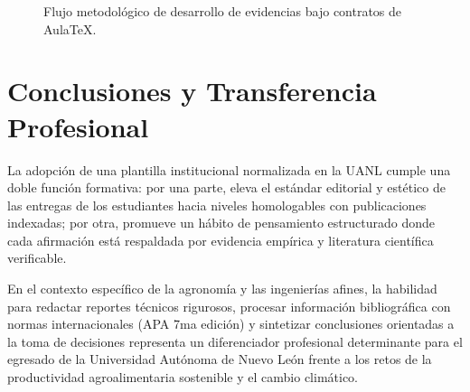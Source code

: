 \documentclass[
	spanish,
	letterpaper, oneside
]{article}
\begin{document}
\begin{figure}[htbp]
	\centering
	\caption{Flujo metodológico de desarrollo de evidencias bajo contratos de AulaTeX.}
	\label{fig:flujo_aulatex}
\end{figure}

\section{Conclusiones y Transferencia Profesional}

La adopción de una plantilla institucional normalizada en la UANL cumple una doble función formativa: por una parte, eleva el estándar editorial y estético de las entregas de los estudiantes hacia niveles homologables con publicaciones indexadas; por otra, promueve un hábito de pensamiento estructurado donde cada afirmación está respaldada por evidencia empírica y literatura científica verificable.

En el contexto específico de la agronomía y las ingenierías afines, la habilidad para redactar reportes técnicos rigurosos, procesar información bibliográfica con normas internacionales (APA 7ma edición) y sintetizar conclusiones orientadas a la toma de decisiones representa un diferenciador profesional determinante para el egresado de la Universidad Autónoma de Nuevo León frente a los retos de la productividad agroalimentaria sostenible y el cambio climático.

\clearpage

\end{document}
